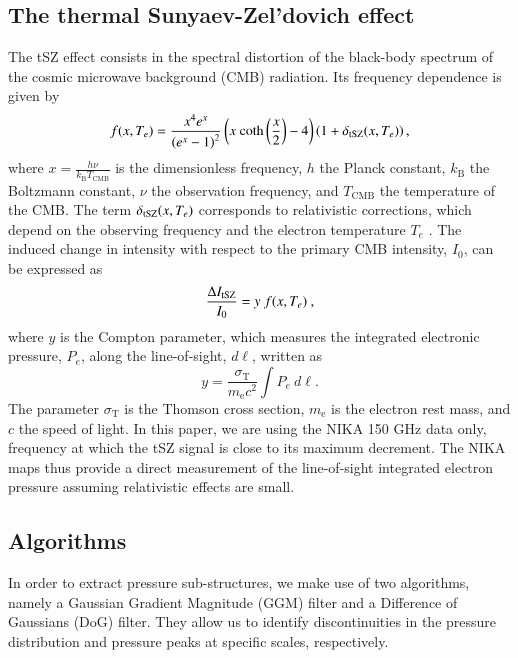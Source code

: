 \documentclass[twocolumn,traditabstract]{aa}
\begin{document}
\subsection{The thermal Sunyaev-Zel'dovich effect}
The tSZ effect consists in the spectral distortion of the black-body spectrum of the cosmic microwave background (CMB) radiation. Its frequency dependence is given by \citep{birkinshaw1999}
\begin{equation}
	f(x, T_e) = \frac{x^4 e^x}{\left(e^x-1\right)^2} \left(x  \ \mathrm{coth}\left(\frac{x}{2}\right) - 4\right) \left( 1 + \delta_{\rm tSZ}(x, T_e) \right), 
	\label{eq:sz_f_x}
\end{equation}
where $x = \frac{h \nu}{k_{\mathrm{B}} T_{\mathrm{CMB}}}$ is the dimensionless frequency, $h$ the Planck constant, $k_{\mathrm{B}}$ the Boltzmann constant, $\nu$ the observation frequency, and $T_{\mathrm{CMB}}$ the temperature of the CMB. The term $\delta_{\rm tSZ}(x,T_e)$ corresponds to relativistic corrections, which depend on the observing frequency and the electron temperature $T_e$ \citep[see, e.g.,][]{Itoh2003}. The induced change in intensity with respect to the primary CMB intensity, $I_0$, can be expressed as
\begin{equation}
	\frac{\Delta I_{\rm tSZ}}{I_0} = y \ f(x, T_e) \ ,
\label{eq:deltaI}
\end{equation}
where $y$ is the Compton parameter, which measures the integrated electronic pressure, $P_{e}$, along the line-of-sight, $d\ell$, written as
   \begin{equation}
	y = \frac{\sigma_{\mathrm{T}}}{m_{\mathrm{e}} c^2} \int P_{e} \ d\ell.
	\label{eq:y_compton}
   \end{equation}
The parameter $\sigma_{\mathrm{T}}$ is the Thomson cross section, $m_{\mathrm{e}}$ is the electron rest mass, and $c$ the speed of light. In this paper, we are using the NIKA 150 GHz data only, frequency at which the tSZ signal is close to its maximum decrement. The NIKA maps thus provide a direct measurement of the line-of-sight integrated electron pressure assuming relativistic effects are small.

\subsection{Algorithms}\label{sec:Algorithms}
In order to extract pressure sub-structures, we make use of two algorithms, namely a Gaussian Gradient Magnitude (GGM) filter and a Difference of Gaussians (DoG) filter. They allow us to identify discontinuities in the pressure distribution and pressure peaks at specific scales, respectively.
\end{document}
